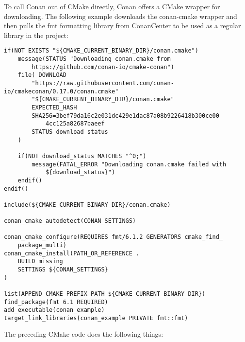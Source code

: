 To call Conan out of CMake directly, Conan offers a CMake wrapper for downloading. The following example downloads the conan-cmake wrapper and then pulls the fmt formatting library from ConanCenter to be used as a regular library in the project:

\begin{lstlisting}[style=styleCMake]
if(NOT EXISTS "${CMAKE_CURRENT_BINARY_DIR}/conan.cmake")
	message(STATUS "Downloading conan.cmake from
		https://github.com/conan-io/cmake-conan")
	file( DOWNLOAD
		"https://raw.githubusercontent.com/conan-io/cmakeconan/0.17.0/conan.cmake"
		"${CMAKE_CURRENT_BINARY_DIR}/conan.cmake"
		EXPECTED_HASH
		SHA256=3bef79da16c2e031dc429e1dac87a08b9226418b300ce00
			4cc125a82687baeef
		STATUS download_status
	)
	
	if(NOT download_status MATCHES "^0;")
		message(FATAL_ERROR "Downloading conan.cmake failed with
			${download_status}")
	endif()
endif()

include(${CMAKE_CURRENT_BINARY_DIR}/conan.cmake)

conan_cmake_autodetect(CONAN_SETTINGS)

conan_cmake_configure(REQUIRES fmt/6.1.2 GENERATORS cmake_find_
	package_multi)
conan_cmake_install(PATH_OR_REFERENCE .
	BUILD missing
	SETTINGS ${CONAN_SETTINGS}
)

list(APPEND CMAKE_PREFIX_PATH ${CMAKE_CURRENT_BINARY_DIR})
find_package(fmt 6.1 REQUIRED)
add_executable(conan_example)
target_link_libraries(conan_example PRIVATE fmt::fmt)
\end{lstlisting}

The preceding CMake code does the following things:

